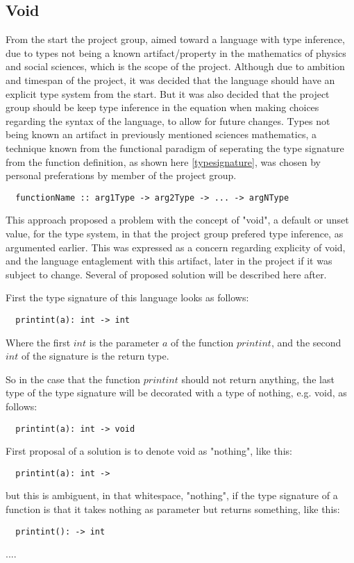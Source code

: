 \subsection{Void}
\label{sub:void}

From the start the project group, aimed toward a language with type inference, due to types not being a known artifact/property in the mathematics of physics and social sciences, which is the scope of the project. Although due to ambition and timespan of the project, it was decided that the language should have an explicit type system from the start. But it was also decided that the project group should be keep type inference in the equation when making choices regarding the syntax of the language, to allow for future changes. %
Types not being known an artifact in previously mentioned sciences mathematics, a technique known from the functional paradigm of seperating the type signature from the function definition, as shown here \cref{typesignature}, was chosen by personal preferations by member of the project group.

\begin{verbatim}
  functionName :: arg1Type -> arg2Type -> ... -> argNType
\end{verbatim}
\label{typesignature}

This approach proposed a problem with the concept of "void", a default or unset value, for the type system, in that the project group prefered type inference, as argumented earlier. This was expressed as a concern regarding explicity of void, and the language entaglement with this artifact, later in the project if it was subject to change. Several of proposed solution will be described here after.

First the type signature of this language looks as follows:
\begin{verbatim}
  printint(a): int -> int
\end{verbatim}
Where the first $int$ is the parameter $a$ of the function $printint$, and the second $int$ of the signature is the return type.

So in the case that the function $printint$ should not return anything, the last type of the type signature will be decorated with a type of nothing, e.g. void, as follows:
\begin{verbatim}
  printint(a): int -> void
\end{verbatim}

First proposal of a solution is to denote void as "nothing", like this:
\begin{verbatim}
  printint(a): int ->
\end{verbatim}
but this is ambiguent, in that whitespace, "nothing", if the type signature of a function is that it takes nothing as parameter but returns something, like this:
\begin{verbatim}
  printint(): -> int
\end{verbatim}
.... %

